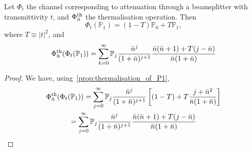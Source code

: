 \documentclass[12pt]{report}
\newcommand{\PP}{\mathbb{P}}
\begin{document}
\begin{prop}
	Let $\Phi_t$ the channel corresponding to attenuation through a beamsplitter with transmittivity $t$, and $\Phi_{\bar n}^{\rm th}$ the thermalisation operation. Then
	\begin{equation}
		\Phi_t(\PP_1)
		= (1-T) \PP_0 + T \PP_1,
	\end{equation}
	where $T\equiv|t|^2$, and
	\begin{equation}
		\Phi_{\bar n}^{\rm th}(\Phi_t(\PP_1))
		= \sum_{k=0}^\infty
		\PP_j
		\frac{\bar n^j}{(1+\bar n)^{j+1}}
		\frac{\bar n(\bar n+1) + T(j-\bar n)}{\bar n(1+\bar n)}
	\end{equation}
	\label{prop:attenuation_and_then_thermalisation_focks}
\end{prop}
\begin{proof}
	We have, using~\cref{prop:thermalisation_of_P1},
	\begin{equation}
	\begin{gathered}
		\Phi_{\bar n}^{\rm th}(\Phi_t(\PP_1))
		= \sum_{j=0}^\infty \PP_j
		\frac{\bar n^j}{(1+\bar n)^{j+1}} \left[
		(1-T) + T \frac{j+\bar n^2}{\bar n(1+\bar n)}
		\right] \\
		= \sum_{j=0}^\infty \PP_j
		\frac{\bar n^j}{(1+\bar n)^{j+1}}
		\frac{\bar n(\bar n+1)+ T(j-\bar n)}{\bar n(1+\bar n)}
	\end{gathered}
	\end{equation}
\end{proof}
\end{document}
